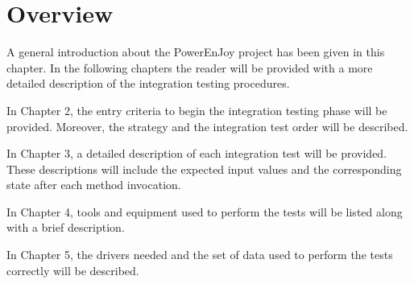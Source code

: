 
\section{Overview}

A general introduction about the PowerEnJoy project has been given in this chapter. In the following chapters the reader will be provided with a more detailed description of the integration testing procedures.

In Chapter 2, the entry criteria to begin the integration testing phase will be provided. Moreover, the strategy and the integration test order will be described.

In Chapter 3, a detailed description of each integration test will be provided. These descriptions will include the expected input values and the corresponding state after each method invocation.

In Chapter 4, tools and equipment used to perform the tests will be listed along with a brief description.

In Chapter 5, the drivers needed and the set of data used to perform the tests correctly will be described.
